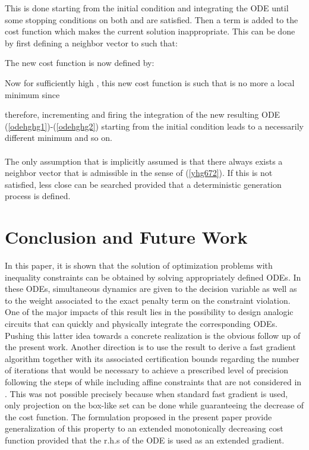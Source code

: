 \documentclass{article}
\begin{document}
This is done starting from the initial condition  and integrating the ODE until some stopping conditions on both  and  are satisfied. Then a term is added to the cost function which makes the current solution  inappropriate. This can be done by first defining a neighbor vector  to  such that:
 
The new cost function  is now defined by:
 
Now for sufficiently high , this new cost function is such that  is no more a local minimum since 

therefore, incrementing  and firing the integration of the new resulting ODE (\ref{odehghg1})-(\ref{odehghg2}) starting from the initial condition  leads to a necessarily different minimum and so on. \ \\ \ \\ 
The only assumption that is implicitly assumed is that there always exists a neighbor vector  that is admissible in the sense of (\ref{yhg672}). If this is not satisfied, less close  can be searched provided that a deterministic generation process is defined.
\section{Conclusion and Future Work} \label{secconclusion} 
\noindent In this paper, it is shown that the solution of optimization problems with inequality constraints can be obtained by solving appropriately defined ODEs. In these ODEs, simultaneous dynamics are given to the decision variable as well as to the weight associated to the exact penalty term on the constraint violation. One of the major impacts of this result lies in the possibility to design analogic circuits that can quickly and physically integrate the corresponding ODEs. Pushing this latter idea towards a concrete realization is the obvious follow up of the present work. Another direction is to use the result to derive a fast gradient algorithm together with its associated certification bounds regarding the number of iterations that would be necessary to achieve a prescribed level of precision following the steps of \cite{Richter:2012} while including affine constraints that are not considered in \cite{Richter:2012}. This was not possible precisely because when standard fast gradient is used, only projection on the box-like set can be done while guaranteeing the decrease of the cost function. The formulation proposed in the present paper provide generalization of this property to an extended monotonically decreasing cost function provided that the r.h.s of the ODE is used as an extended gradient.  



\end{document}
